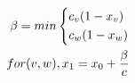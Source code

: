 \begin{align}
  \label{eqn:step}
  \beta = min 
  \begin{dcases} 
    c_v(1 - x_v) \\
    c_w(1 - x_w)
  \end{dcases} \nonumber \\ 
  for (v, w), x_1 = x_0 + \frac{\beta}{c}
\end{align}